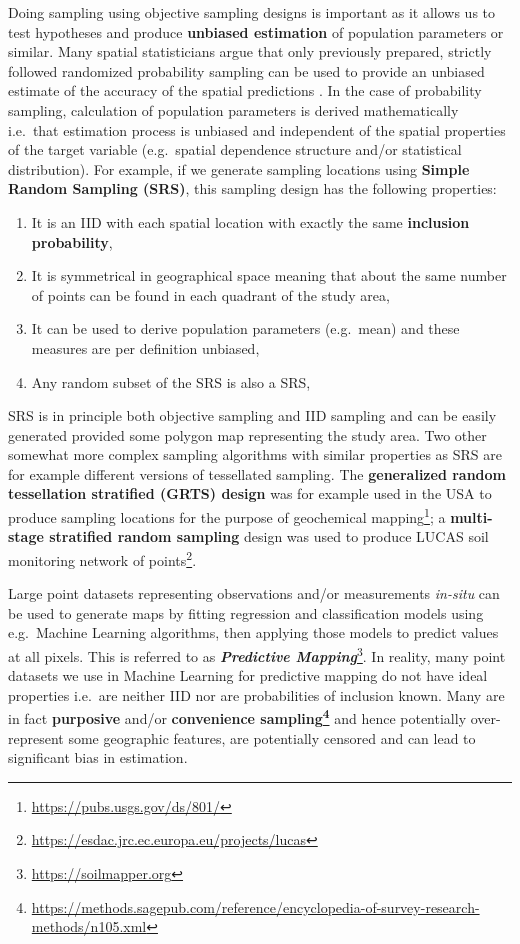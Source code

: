 \documentclass[
  graybox,natbib,nospthms]{svmono}
\providecommand{\tightlist}{%
  \setlength{\itemsep}{0pt}\setlength{\parskip}{0pt}}
\providecommand{\tightlist}{\setlength{\itemsep}{0pt}\setlength{\parskip}{0pt}}
\renewcommand{\href}[2]{#2 (\url{#1})}
\renewcommand{\href}[2]{#2\footnote{\url{#1}}}
\begin{document}
Doing sampling using objective sampling designs is important as it
allows us to test hypotheses and produce \textbf{unbiased estimation} of
population parameters or similar. Many spatial statisticians argue that
only previously prepared, strictly followed randomized probability
sampling can be used to provide an unbiased estimate of the accuracy of
the spatial predictions \citep{Brus2021sampling}. In the case
of probability sampling, calculation of population parameters is derived
mathematically i.e.~that estimation process is unbiased and independent
of the spatial properties of the target variable (e.g.~spatial
dependence structure and/or statistical distribution). For example, if
we generate sampling locations using \textbf{Simple Random Sampling (SRS)},
this sampling design has the following properties:

\begin{enumerate}
\def\labelenumi{\arabic{enumi}.}
\tightlist
\item
  It is an IID with each spatial location with exactly the same
  \textbf{inclusion probability},
\item
  It is symmetrical in geographical space meaning that about the same
  number of points can be found in each quadrant of the study area,
\item
  It can be used to derive population parameters (e.g.~mean) and these
  measures are per definition unbiased,
\item
  Any random subset of the SRS is also a SRS,
\end{enumerate}

SRS is in principle both objective sampling and IID sampling and can be
easily generated provided some polygon map representing the study area.
Two other somewhat more complex sampling algorithms with similar
properties as SRS are for example different versions of tessellated
sampling. The \textbf{generalized random tessellation stratified (GRTS)
design} was for example used in the USA to produce sampling locations
for the purpose of \href{https://pubs.usgs.gov/ds/801/}{geochemical mapping};
a \textbf{multi-stage stratified random sampling} design was used to produce \href{https://esdac.jrc.ec.europa.eu/projects/lucas}{LUCAS soil monitoring
network of points}.

Large point datasets representing observations and/or measurements
\emph{in-situ} can be used to generate maps by fitting regression and
classification models using e.g.~Machine Learning algorithms, then
applying those models to predict values at all pixels. This is referred
to as \href{https://soilmapper.org}{\textbf{\emph{Predictive Mapping}}}. In reality,
many point datasets we use in Machine Learning for predictive mapping do
not have ideal properties i.e.~are neither IID nor are probabilities of
inclusion known. Many are in fact \textbf{purposive} and/or \textbf{\href{https://methods.sagepub.com/reference/encyclopedia-of-survey-research-methods/n105.xml}{convenience sampling}}
and hence potentially over-represent some geographic features, are
potentially censored and can lead to significant bias in estimation.
\end{document}

